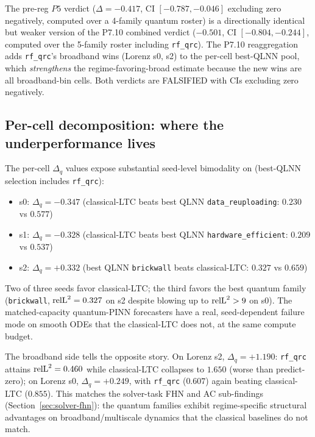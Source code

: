 The pre-reg $P5$ verdict ($\Delta = -0.417$, CI $[-0.787, -0.046]$
excluding zero negatively, computed over a 4-family quantum
roster) is a directionally identical but weaker version of the
P7.10 combined verdict ($-0.501$, CI $[-0.804, -0.244]$,
computed over the 5-family roster including \texttt{rf\_qrc}).
The P7.10 reaggregation adds \texttt{rf\_qrc}'s broadband
wins (Lorenz s0, s2) to the per-cell best-QLNN pool, which
\emph{strengthens} the regime-favoring-broad estimate because the
new wins are all broadband-bin cells. Both verdicts are FALSIFIED
with CIs excluding zero negatively.

\subsection{Per-cell decomposition: where the underperformance lives}
\label{sec:forecaster-percell-decomp}

The per-cell $\Delta_q$ values expose substantial
seed-level bimodality on \lv{} (best-QLNN selection includes
\texttt{rf\_qrc}):

\begin{itemize}
  \item \lv{} s0: $\Delta_q = -0.347$
        (classical-LTC beats best QLNN \texttt{data\_reuploading}:
        $0.230$ vs $0.577$)
  \item \lv{} s1: $\Delta_q = -0.328$
        (classical-LTC beats best QLNN \texttt{hardware\_efficient}:
        $0.209$ vs $0.537$)
  \item \lv{} s2: $\Delta_q = +0.332$
        (best QLNN \texttt{brickwall} beats classical-LTC:
        $0.327$ vs $0.659$)
\end{itemize}

Two of three \lv{} seeds favor classical-LTC; the third favors
the best quantum family (\texttt{brickwall}, $\mathrm{relL}^2 = 0.327$ on
s2 despite blowing up to $\mathrm{relL}^2 > 9$ on \vdp{} s0). The
matched-capacity quantum-PINN forecasters have a real,
seed-dependent failure mode on smooth ODEs that the classical-LTC
does not, at the same compute budget.

The broadband side tells the opposite story. On Lorenz s2,
$\Delta_q = +1.190$: \texttt{rf\_qrc} attains $\mathrm{relL}^2 = 0.460$
while classical-LTC collapses to $1.650$ (worse than
predict-zero); on Lorenz s0, $\Delta_q = +0.249$, with
\texttt{rf\_qrc} ($0.607$) again beating classical-LTC ($0.855$).
This matches the solver-task FHN and AC sub-findings
(Section~\ref{sec:solver-fhn}): the quantum families exhibit
regime-specific structural advantages on broadband/multiscale
dynamics that the classical baselines do not match.


